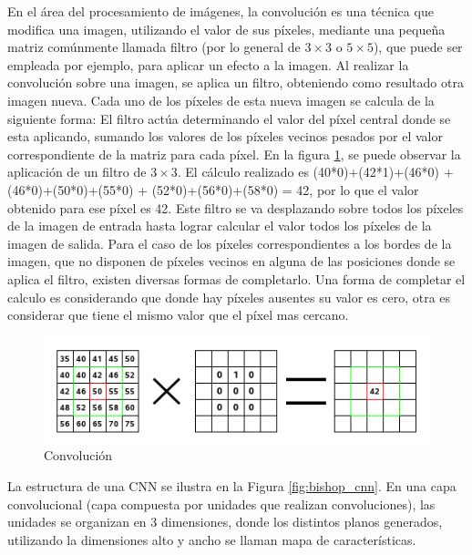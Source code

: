\documentclass[a4paper,11pt,spanish]{book}
\begin{document}
      En el área del procesamiento de imágenes, la convolución es una técnica que modifica una imagen, utilizando el valor de sus píxeles,
      mediante una pequeña matriz comúnmente llamada filtro (por lo general de $3\times3$ o $5\times5$), que puede ser empleada por ejemplo, para aplicar un efecto 
      a la imagen.
      Al realizar la convolución sobre una imagen, se aplica un filtro, obteniendo como resultado otra imagen nueva. Cada uno de los píxeles de esta nueva imagen se 
      calcula de la siguiente forma:
      El filtro actúa determinando el valor del píxel central donde se esta aplicando, sumando los valores de los píxeles vecinos pesados por el valor correspondiente de la matriz para
      cada píxel. En la figura \ref{fig:convolution}, se puede observar la aplicación de un filtro de $3\times3$. El cálculo realizado es (40*0)+(42*1)+(46*0) + (46*0)+(50*0)+(55*0) + (52*0)+(56*0)+(58*0) = 42,
      por lo que el valor obtenido para ese píxel es 42.
      Este filtro se va desplazando sobre todos los píxeles de la imagen de entrada hasta lograr calcular el valor todos los píxeles de la imagen de salida. 
      Para el caso de los píxeles correspondientes a los bordes de la imagen, que no disponen de píxeles vecinos en alguna de las posiciones donde se aplica el filtro, 
      existen diversas formas de completarlo. 
      Una forma de completar el calculo es considerando que donde hay píxeles ausentes su valor es cero, otra es considerar que tiene el mismo valor que el píxel mas 
      cercano.
      
      \begin{figure}[h]
	\begin{center}
	\includegraphics[width=0.8\linewidth]{./img/convolution.png}
	\end{center}
	\caption{Convolución}
	\label{fig:convolution}
      \end{figure}

      La estructura de una CNN se ilustra en la Figura \ref{fig:bishop_cnn}. En una capa convolucional (capa compuesta por unidades que realizan convoluciones), 
      las unidades se organizan en 3 dimensiones, donde los distintos planos generados, utilizando la dimensiones alto y ancho se llaman mapa de características.
      
\end{document}
